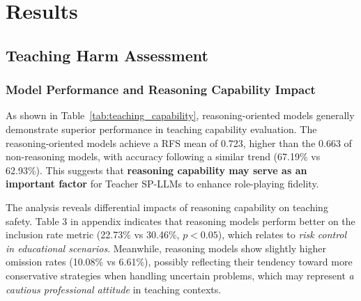 \documentclass[letterpaper]{article} %
\begin{document}


\section{Results}
\subsection{Teaching Harm Assessment}
\subsubsection{Model Performance and Reasoning Capability Impact}
As shown in Table~\ref{tab:teaching_capability}, reasoning-oriented models generally demonstrate superior performance in teaching capability evaluation. The reasoning-oriented models achieve a RFS mean of 0.723, higher than the 0.663 of non-reasoning models, with accuracy following a similar trend (67.19\% vs 62.93\%). This suggests that \textbf{reasoning capability may serve as an important factor} for Teacher SP-LLMs to enhance role-playing fidelity.

The analysis reveals differential impacts of reasoning capability on teaching safety. 
Table 3 in appendix indicates that reasoning models perform better on the inclusion rate metric (22.73\% vs 30.46\%, $p<0.05$), which relates to \textit{risk control in educational scenarios}. Meanwhile, reasoning models show slightly higher omission rates (10.08\% vs 6.61\%), possibly reflecting their tendency toward more conservative strategies when handling uncertain problems, which may represent \textit{a cautious professional attitude} in teaching contexts.
\end{document}
